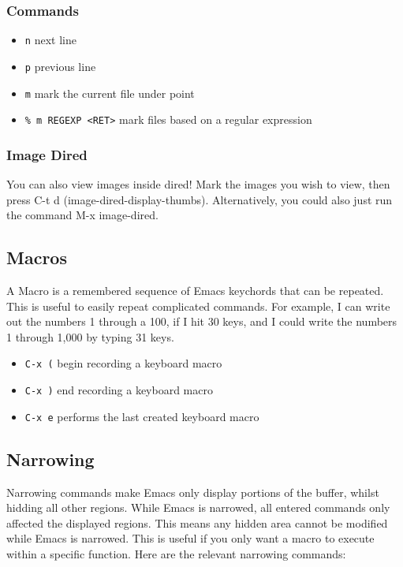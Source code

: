 \documentclass[11pt]{article}
\begin{document}
\subsubsection{Commands}
\label{sec:orgheadline11}
\begin{itemize}
\item \texttt{n} next line
\item \texttt{p} previous line
\item \texttt{m} mark the current file under point
\item \texttt{\% m REGEXP <RET>}  mark files based on a regular expression
\end{itemize}
\subsubsection{Image Dired}
\label{sec:orgheadline12}
You can also view images inside dired!  Mark the images you wish to view, then press C-t d (image-dired-display-thumbs). Alternatively, you could also just run the command M-x image-dired.
\subsection{Macros}
\label{sec:orgheadline14}
A Macro is a remembered sequence of Emacs keychords that can be repeated.  This is useful to easily repeat complicated commands.  For example, I can write out the numbers 1 through a 100, if I hit 30 keys, and I could write the numbers 1 through 1,000 by typing 31 keys.

\begin{itemize}
\item \texttt{C-x (} begin recording a keyboard macro
\item \texttt{C-x )} end recording a keyboard macro
\item \texttt{C-x e}  performs the last created keyboard macro
\end{itemize}
\subsection{Narrowing}
\label{sec:orgheadline15}
Narrowing commands make Emacs only display portions of the buffer, whilst hidding all other regions.  While Emacs is narrowed, all entered commands only affected the displayed regions.  This means any hidden area cannot be modified while Emacs is narrowed.  This is useful if you only want a macro to execute within a specific function.  Here are the relevant narrowing commands:
\end{document}
